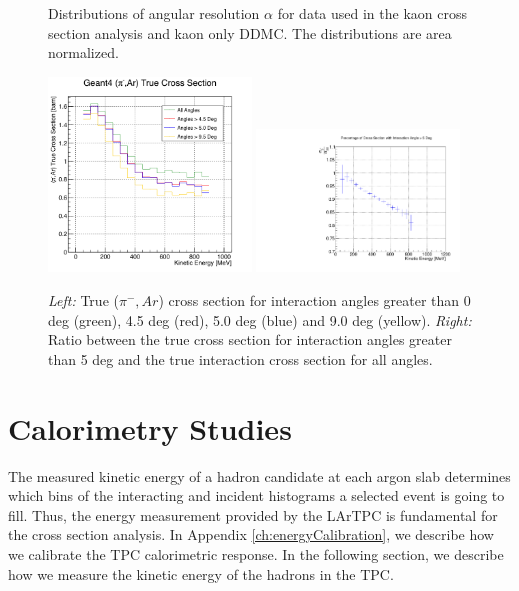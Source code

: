 \begin{figure}[ht]
\begin{minipage}[t]{0.45\linewidth}
\caption[]{Distributions of angular resolution $\alpha$ for data used in the kaon cross section analysis and kaon only DDMC. The distributions are area normalized. } \label{fig:trackingResolutionK}
\end{minipage}
\end{figure}





\begin{figure}[p]
\centering
\includegraphics[width=0.48\textwidth]{Chapter-5/Images/cTrueXSAngle.png}
\includegraphics[width=0.48\textwidth]{Chapter-5/Images/RatioXSs.pdf}
\caption{\emph{Left:} True ($\pi^-, Ar$) cross section for interaction angles greater than 0 deg (green), 4.5 deg (red), 5.0 deg  (blue) and 9.0 deg (yellow). \emph{Right:} Ratio between the true cross section for interaction angles greater than 5 deg and the true interaction cross section for all angles.}
\label{fig:trueWithAngles}
\end{figure}



\clearpage

\section{Calorimetry Studies}\label{ch:energyCal} 
The measured kinetic energy of a hadron candidate at each argon slab determines which bins of the interacting and incident histograms a selected event is going to fill.  Thus, the energy measurement provided by the LArTPC is fundamental for the cross section analysis. In Appendix  \ref{ch:energyCalibration}, we describe how we calibrate the TPC calorimetric response. In the following section, we describe how we measure the kinetic energy of the hadrons in the TPC.




